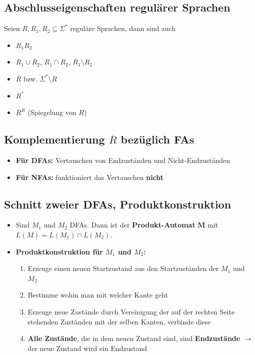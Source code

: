 \documentclass[ieeetran]{article}
\begin{document}
\subsection{Abschlusseigenschaften regulärer Sprachen} %
\label{sub:abschlusseigenschaften_regulärer_sprachen}
Seien $R, R_1, R_2 \subseteq \Sigma^*$ reguläre Sprachen, dann sind auch
\begin{itemize}
  \item $R_1 R_2$
\item $R_1 \cup R_2$, $R_1 \cap R_2$, $R_1 \setminus R_2$
\item $\overline{R}$ bzw. $\Sigma^* \setminus R$

\item $R^*$
\item $R^R$ (Spiegelung von $R$)
\end{itemize}

\subsection{Komplementierung $\overline{R}$ bezüglich FAs} %
\label{sub:komplementierung_bezüglich_fAs}
\begin{itemize}
  \item \textbf{Für DFAs:} Vertauschen von Endzuständen und Nicht-Endzuständen
\item \textbf{Für NFAs:} funktioniert das Vertauschen \textbf{nicht} 
\end{itemize}

\subsection{Schnitt zweier DFAs, Produktkonstruktion} %
\label{sub:produktkonstruktion}
\begin{itemize}
	\item Sind $M_1$ und $M_2$ DFAs. Dann ist der \textbf{Produkt-Automat} $\mathbf{M}$ mit $L(M) = L(M_1) \cap L(M_2)$.

	\item \textbf{Produktkonstruktion für $M_1$ und $M_2$:}
		\begin{enumerate}
			\item Erzeuge einen neuen Startzustand aus den Startzuständen der $M_1$ und $M_2$
			\item Bestimme wohin man mit welcher Kante geht
			\item Erzeuge neue Zustände durch Vereinigung der auf der rechten Seite stehenden Zuständen mit der selben Kanten, verbinde diese
			\item \textbf{Alle Zustände}, die in dem neuen Zustand sind, sind \textbf{Endzustände} $\rightarrow$ der neue Zustand wird ein Endzustand
		\end{enumerate}
\end{itemize}
\end{document}
